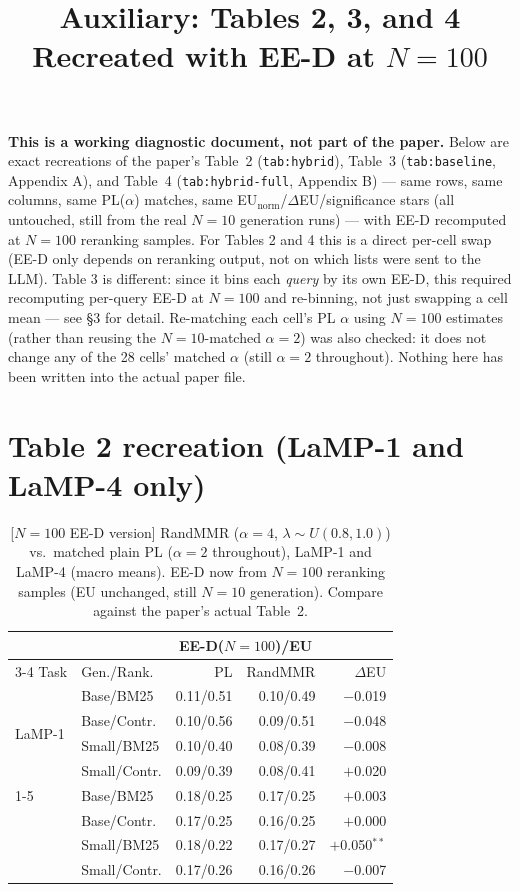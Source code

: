 \documentclass[10pt]{article}
\title{Auxiliary: Tables 2, 3, and 4 Recreated with EE-D at $N{=}100$}
\author{}
\date{}
\begin{document}
\maketitle

\noindent\textbf{This is a working diagnostic document, not part of the paper.}
Below are exact recreations of the paper's Table~2 (\texttt{tab:hybrid}), Table~3
(\texttt{tab:baseline}, Appendix A), and Table~4 (\texttt{tab:hybrid-full}, Appendix
B) --- same rows, same columns, same PL($\alpha$) matches, same
EU$_{\text{norm}}$/$\Delta$EU/significance stars (all untouched, still from the real
$N{=}10$ generation runs) --- with EE-D recomputed at $N{=}100$ reranking samples.
For Tables 2 and 4 this is a direct per-cell swap (EE-D only depends on reranking
output, not on which lists were sent to the LLM). Table 3 is different: since it
bins each \emph{query} by its own EE-D, this required recomputing per-query EE-D at
$N{=}100$ and re-binning, not just swapping a cell mean --- see \S3 for detail.
Re-matching each cell's PL $\alpha$ using $N{=}100$ estimates (rather than reusing
the $N{=}10$-matched $\alpha{=}2$) was also checked: it does not change any of the
28 cells' matched $\alpha$ (still $\alpha{=}2$ throughout). Nothing here has been
written into the actual paper file.

\section{Table 2 recreation (LaMP-1 and LaMP-4 only)}

\begin{table}[h]
\centering
\scriptsize
\setlength{\tabcolsep}{3pt}
\caption{[$N{=}100$ EE-D version] RandMMR ($\alpha{=}4$, $\lambda\sim U(0.8,1.0)$)
vs.\ matched plain PL ($\alpha{=}2$ throughout), LaMP-1 and LaMP-4 (macro means).
EE-D now from $N{=}100$ reranking samples (EU unchanged, still $N{=}10$ generation).
Compare against the paper's actual Table~2.}
\begin{tabular}{@{}ll rr r@{}}
\toprule
& & \multicolumn{2}{c}{EE-D($N{=}100$)/EU} & \\
\cmidrule(lr){3-4}
Task & Gen./Rank. & PL & RandMMR & $\Delta$EU \\
\midrule
\multirow{4}{*}{LaMP-1} & Base/BM25    & 0.11/0.51 & 0.10/0.49 & $-$0.019 \\
 & Base/Contr.  & 0.10/0.56 & 0.09/0.51 & $-$0.048 \\
 & Small/BM25   & 0.10/0.40 & 0.08/0.39 & $-$0.008 \\
 & Small/Contr. & 0.09/0.39 & 0.08/0.41 & $+$0.020 \\
\cmidrule(lr){1-5}
\multirow{4}{*}{LaMP-4} & Base/BM25    & 0.18/0.25 & 0.17/0.25 & $+$0.003 \\
 & Base/Contr.  & 0.17/0.25 & 0.16/0.25 & $+$0.000 \\
 & Small/BM25   & 0.18/0.22 & 0.17/0.27 & $+$0.050$^{**}$ \\
 & Small/Contr. & 0.17/0.26 & 0.16/0.26 & $-$0.007 \\
\bottomrule
\end{tabular}
\end{table}
\end{document}
